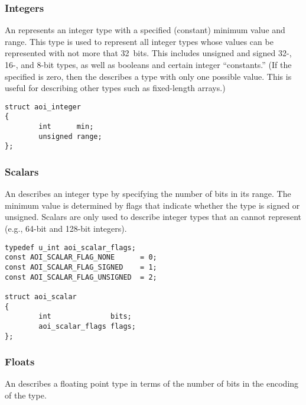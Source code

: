 \subsubsection{Integers}

An  represents an integer type with a specified (constant)
minimum value and range.  This type is used to represent all integer types
whose values can be represented with not more that 32~bits.  This includes
unsigned and signed \mbox{32-,} \mbox{16-,} and 8-bit types, as well as
booleans and certain integer ``constants.''  (If the specified  is
zero, then the  describes a type with only one possible value.
This is useful for describing other types such as fixed-length arrays.)

\begin{verbatim}
struct aoi_integer
{
        int      min;
        unsigned range;
};
\end{verbatim}


\subsubsection{Scalars}

An  describes an integer type by specifying the number of bits
in its range.  The minimum value is determined by flags that indicate whether
the type is signed or unsigned.  Scalars are only used to describe integer
types that an  cannot represent (e.g., 64-bit and 128-bit
integers).

\begin{verbatim}
typedef u_int aoi_scalar_flags;
const AOI_SCALAR_FLAG_NONE      = 0;
const AOI_SCALAR_FLAG_SIGNED    = 1;
const AOI_SCALAR_FLAG_UNSIGNED  = 2;

struct aoi_scalar
{
        int              bits;
        aoi_scalar_flags flags;
};
\end{verbatim}


\subsubsection{Floats}

An  describes a floating point type in terms of the number of
bits in the encoding of the type.

